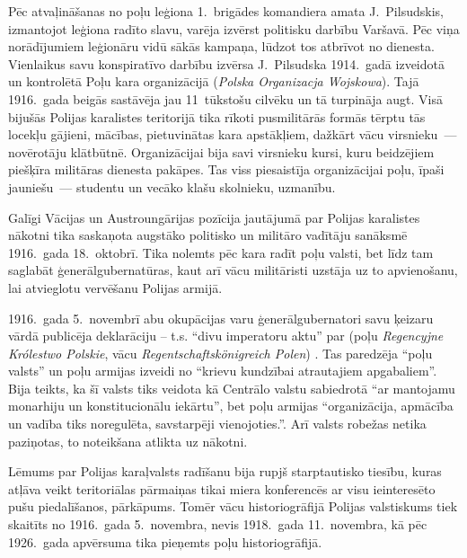 \documentclass[twoside,a5paper,12pt,fleqn,openany]{extbook}
\newcommand{\pltxti}[1]{\textit{\textpolish{#1}}}
\newcommand{\detxti}[1]{\textit{\textgerman{#1}}}
\begin{document}
Pēc atvaļināšanas no poļu leģiona 1.~brigādes komandiera amata J.~Pilsudskis, izmantojot leģiona radīto slavu, varēja izvērst politisku darbību Varšavā. Pēc viņa norādījumiem leģionāru vidū sākās kampaņa, lūdzot tos atbrīvot no dienesta. Vienlaikus savu konspiratīvo darbību izvērsa J.~Pilsudska 1914.~gadā izveidotā un kontrolētā Poļu kara organizācijā (\pltxti{Polska Organizacja Wojskowa}). Tajā 1916.~gada beigās sastāvēja jau 11~tūkstošu cilvēku un tā turpināja augt. Visā bijušās Polijas karalistes teritorijā tika rīkoti pusmilitārās formās tērptu tās locekļu gājieni, mācības, pietuvinātas kara apstākļiem, dažkārt vācu virsnieku~--- novērotāju klātbūtnē. Organizācijai bija savi virsnieku kursi, kuru beidzējiem piešķīra militāras dienesta pakāpes. Tas viss piesaistīja organizācijai poļu, īpaši jauniešu~--- studentu un vecāko klašu skolnieku, uzmanību.

Galīgi Vācijas un Austroungārijas pozīcija jautājumā par Polijas karalistes nākotni tika saskaņota augstāko politisko un militāro vadītāju sanāksmē 1916.~gada 18.~oktobrī. Tika nolemts pēc kara radīt poļu valsti, bet līdz tam saglabāt ģenerālgubernatūras, kaut arī vācu militāristi uzstāja uz to apvienošanu, lai atvieglotu vervēšanu Polijas armijā.

1916.~gada 5.~novembrī abu okupācijas varu ģenerālgubernatori savu ķeizaru vārdā publicēja deklarāciju -- t.s. ``divu imperatoru aktu'' par  (poļu \pltxti{Regencyjne Królestwo Polskie}, vācu \detxti{Regentschaftskönigreich Polen}) . Tas paredzēja ``poļu valsts'' un poļu armijas izveidi no ``krievu kundzībai atrautajiem apgabaliem''. Bija teikts, ka šī valsts tiks veidota kā Centrālo valstu sabiedrotā ``ar mantojamu monarhiju un konstitucionālu iekārtu'', bet poļu armijas ``organizācija, apmācība un vadība tiks noregulēta, savstarpēji vienojoties.''. Arī valsts robežas netika paziņotas, to noteikšana atlikta uz nākotni.

Lēmums par Polijas karaļvalsts radīšanu bija rupjš starptautisko tiesību, kuras atļāva veikt teritoriālas pārmaiņas tikai miera konferencēs ar visu ieinteresēto pušu piedalīšanos, pārkāpums. Tomēr vācu historiogrāfijā Polijas valstiskums tiek skaitīts no 1916.~gada 5.~novembra, nevis 1918.~gada 11.~novembra, kā pēc 1926.~gada apvērsuma tika pieņemts poļu historiogrāfijā.
\end{document}
